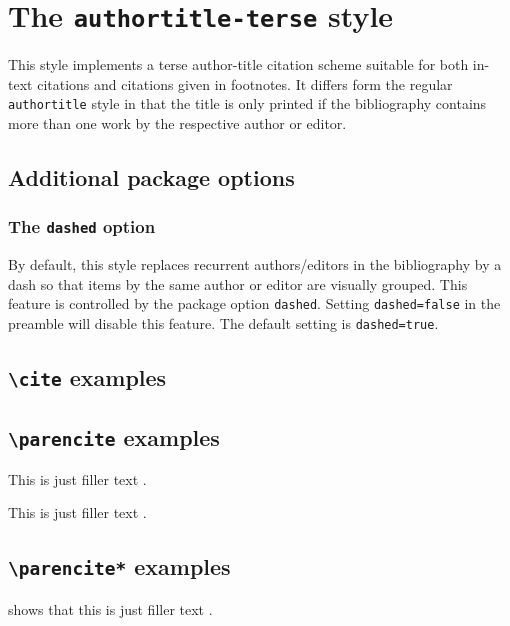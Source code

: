 \documentclass[a4paper]{article}
\newcommand{\cmd}[1]{\texttt{\textbackslash #1}}
\begin{document}
\section*{The \texttt{authortitle-terse} style}

This style implements a terse author-title citation scheme suitable
for both in-text citations and citations given in footnotes. It
differs form the regular \texttt{authortitle} style in that the
title is only printed if the bibliography contains more than one
work by the respective author or editor.

\subsection*{Additional package options}

\subsubsection*{The \texttt{dashed} option}

By default, this style replaces recurrent authors/editors in the
bibliography by a dash so that items by the same author or editor
are visually grouped. This feature is controlled by the package
option \texttt{dashed}. Setting \texttt{dashed=false} in the
preamble will disable this feature. The default setting is
\texttt{dashed=true}.

\subsection*{\cmd{cite} examples}

\cite{averroes/bland}

\cite{aristotle:physics}

\cite{aristotle:rhetoric}

\subsection*{\cmd{parencite} examples}

This is just filler text \parencite{averroes/bland}.

This is just filler text \parencite{aristotle:rhetoric}.

\subsection*{\cmd{parencite*} examples}

\citeauthor{aristotle:rhetoric} shows that this is just filler
text \parencite*{aristotle:rhetoric}.
\end{document}
